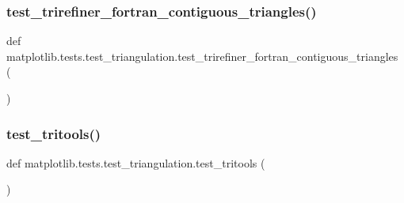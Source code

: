 \subsubsection{\texorpdfstring{test\+\_\+trirefiner\+\_\+fortran\+\_\+contiguous\+\_\+triangles()}{test\_trirefiner\_fortran\_contiguous\_triangles()}}
{\footnotesize\ttfamily def matplotlib.\+tests.\+test\+\_\+triangulation.\+test\+\_\+trirefiner\+\_\+fortran\+\_\+contiguous\+\_\+triangles (\begin{DoxyParamCaption}{ }\end{DoxyParamCaption})}

\mbox{\label{namespacematplotlib_1_1tests_1_1test__triangulation_ad782b2e8e709192b565e921e51fa4666}} 
\subsubsection{\texorpdfstring{test\+\_\+tritools()}{test\_tritools()}}
{\footnotesize\ttfamily def matplotlib.\+tests.\+test\+\_\+triangulation.\+test\+\_\+tritools (\begin{DoxyParamCaption}{ }\end{DoxyParamCaption})}

